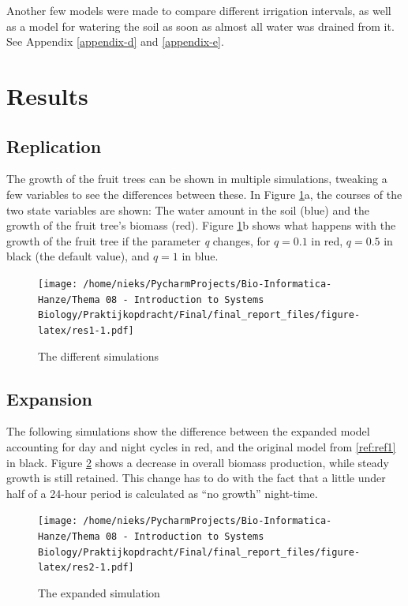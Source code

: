 \documentclass[
]{article}
\begin{document}
Another few models were made to compare different irrigation intervals,
as well as a model for watering the soil as soon as almost all water was
drained from it. See Appendix \ref{appendix-d} and \ref{appendix-e}.

\newpage

\hypertarget{results}{%
\section{Results}\label{results}}

\hypertarget{replication}{%
\subsection{Replication}\label{replication}}

The growth of the fruit trees can be shown in multiple simulations,
tweaking a few variables to see the differences between these. In Figure
\ref{fig:fig2}a, the courses of the two state variables are shown: The
water amount in the soil (blue) and the growth of the fruit tree's
biomass (red). Figure \ref{fig:fig2}b shows what happens with the growth
of the fruit tree if the parameter \emph{q} changes, for \(q = 0.1\) in
red, \(q = 0.5\) in black (the default value), and \(q = 1\) in blue.

\begin{figure}
\centering
\texttt{[image: /home/nieks/PycharmProjects/Bio-Informatica-Hanze/Thema 08 - Introduction to Systems Biology/Praktijkopdracht/Final/final\_report\_files/figure-latex/res1-1.pdf]}
\caption{\label{fig:fig2}The different simulations}
\end{figure}

\newpage

\hypertarget{expansion}{%
\subsection{Expansion}\label{expansion}}

The following simulations show the difference between the expanded model
accounting for day and night cycles in red, and the original model from
\ref{ref:ref1} in black. Figure \ref{fig:fig3} shows a decrease in
overall biomass production, while steady growth is still retained. This
change has to do with the fact that a little under half of a 24-hour
period is calculated as ``no growth'' night-time.

\begin{figure}
\centering
\texttt{[image: /home/nieks/PycharmProjects/Bio-Informatica-Hanze/Thema 08 - Introduction to Systems Biology/Praktijkopdracht/Final/final\_report\_files/figure-latex/res2-1.pdf]}
\caption{\label{fig:fig3}The expanded simulation}
\end{figure}
\end{document}
